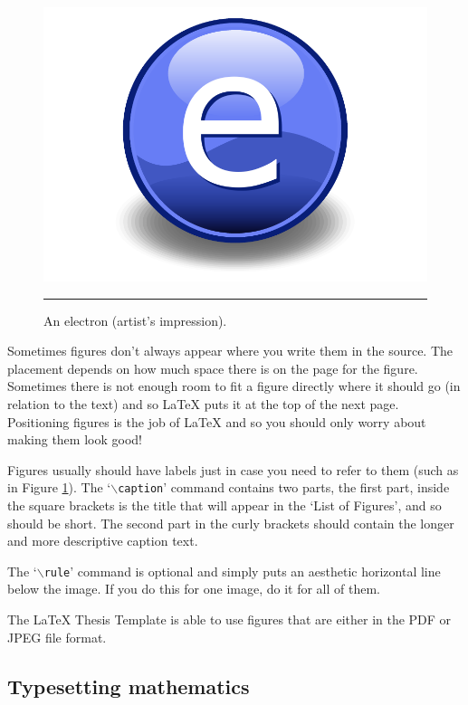 \begin{figure}[htbp]
	\centering
		\includegraphics{Figures/Electron.pdf}
		\rule{35em}{0.5pt}
	\caption[An Electron]{An electron (artist's impression).}
	\label{fig:Electron}
\end{figure}

Sometimes figures don't always appear where you write them in the source. The placement depends on how much space there is on the page for the figure. Sometimes there is not enough room to fit a figure directly where it should go (in relation to the text) and so \LaTeX{} puts it at the top of the next page. Positioning figures is the job of \LaTeX{} and so you should only worry about making them look good!

Figures usually should have labels just in case you need to refer to them (such as in Figure \ref{fig:Electron}). The `$\backslash$\texttt{caption}' command contains two parts, the first part, inside the square brackets is the title that will appear in the `List of Figures', and so should be short. The second part in the curly brackets should contain the longer and more descriptive caption text.

The `$\backslash$\texttt{rule}' command is optional and simply puts an aesthetic horizontal line below the image. If you do this for one image, do it for all of them.

The \LaTeX{} Thesis Template is able to use figures that are either in the PDF or JPEG file format.

\subsection{Typesetting mathematics}

